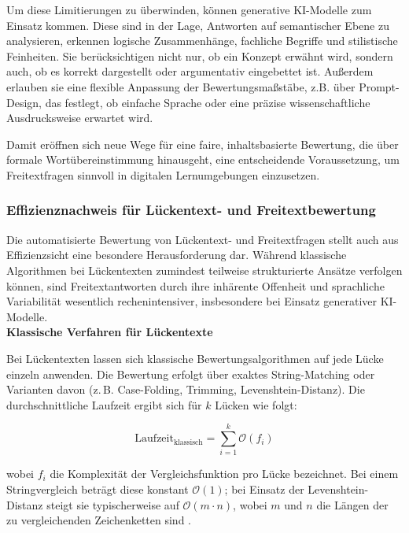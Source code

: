 \documentclass[a4paper,12pt]{article}
\begin{document}
Um diese Limitierungen zu überwinden, können generative KI-Modelle zum Einsatz kommen. Diese sind in der Lage, Antworten auf semantischer Ebene zu analysieren, erkennen logische Zusammenhänge, fachliche Begriffe und stilistische Feinheiten. Sie berücksichtigen nicht nur, ob ein Konzept erwähnt wird, sondern auch, ob es korrekt dargestellt oder argumentativ eingebettet ist. Außerdem erlauben sie eine flexible Anpassung der Bewertungsmaßstäbe, z.B. über Prompt-Design, das festlegt, ob einfache Sprache oder eine präzise wissenschaftliche Ausdrucksweise erwartet wird.

Damit eröffnen sich neue Wege für eine faire, inhaltsbasierte Bewertung, die über formale Wortübereinstimmung hinausgeht, eine entscheidende Voraussetzung, um Freitextfragen sinnvoll in digitalen Lernumgebungen einzusetzen.

\subsubsection{Effizienznachweis für Lückentext- und Freitextbewertung}

Die automatisierte Bewertung von Lückentext- und Freitextfragen stellt auch aus Effizienzsicht eine besondere Herausforderung dar. Während klassische Algorithmen bei Lückentexten zumindest teilweise strukturierte Ansätze verfolgen können, sind Freitextantworten durch ihre inhärente Offenheit und sprachliche Variabilität wesentlich rechenintensiver, insbesondere bei Einsatz generativer KI-Modelle.\\



\textbf{Klassische Verfahren für Lückentexte}  

Bei Lückentexten lassen sich klassische Bewertungsalgorithmen auf jede Lücke einzeln anwenden. Die Bewertung erfolgt über exaktes String-Matching oder Varianten davon (z.\,B. Case-Folding, Trimming, Levenshtein-Distanz). Die durchschnittliche Laufzeit ergibt sich für $k$ Lücken wie folgt:

\[
\text{Laufzeit}_{\text{klassisch}} = \sum_{i=1}^{k} \mathcal{O}(f_i)
\]

wobei $f_i$ die Komplexität der Vergleichsfunktion pro Lücke bezeichnet.  
Bei einem Stringvergleich beträgt diese konstant \(\mathcal{O}(1)\); bei Einsatz der Levenshtein-Distanz steigt sie typischerweise auf \(\mathcal{O}(m \cdot n)\), wobei \(m\) und \(n\) die Längen der zu vergleichenden Zeichenketten sind \parencite[S. 985]{cormen}.\\
\end{document}
